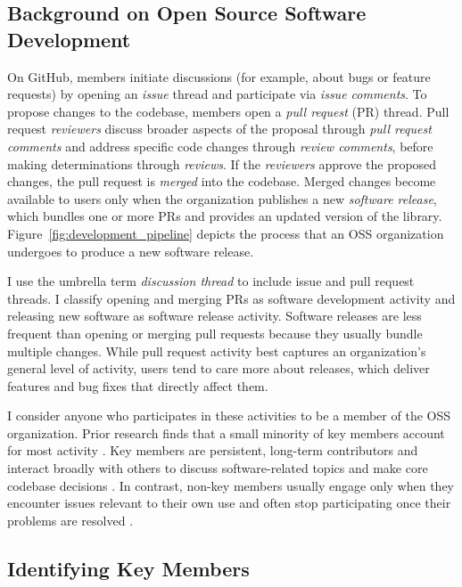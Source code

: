 \documentclass[12pt,notitlepage]{article}
\begin{document}
\subsection{Background on Open Source Software Development} \label{sec:oss_background}
On GitHub, members initiate discussions (for example, about bugs or feature requests) by opening an \textit{issue} thread and participate via \textit{issue comments}.
To propose changes to the codebase, members open a \textit{pull request} (PR) thread. 
Pull request \textit{reviewers} discuss broader aspects of the proposal through \textit{pull request comments} and address specific code changes through \textit{review comments}, before making determinations through \textit{reviews}.
If the \textit{reviewers} approve the proposed changes, the pull request is \textit{merged} into the codebase.
Merged changes become available to users only when the organization publishes a new \textit{software release}, which bundles one or more PRs and provides an updated version of the library.
Figure~\ref{fig:development_pipeline} depicts the process that an OSS organization undergoes to produce a new software release.




I use the umbrella term \textit{discussion thread} to include issue and pull request threads.
I classify opening and merging PRs as software development activity and releasing new software as software release activity. 
Software releases are less frequent than opening or merging pull requests because they usually bundle multiple changes.
While pull request activity best captures an organization's general level of activity, users tend to care more about releases, which deliver features and bug fixes that directly affect them.


I consider anyone who participates in these activities to be a member of the OSS organization.
Prior research finds that a small minority of key members account for most activity \citep{mockus_two_2002, crowston_hierarchy_2006}.
Key members are persistent, long-term contributors and interact broadly with others to discuss software-related topics and make core codebase decisions \citep{mockus_two_2002, bao_longtime_2021}.
In contrast, non-key members usually engage only when they encounter issues relevant to their own use and often stop participating once their problems are resolved \citep{hippel_open_2003}.
\subsection{Identifying Key Members}\label{sec:key_members}
\end{document}
